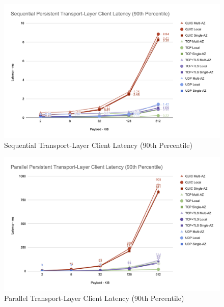 \clearpage

\begin{figure}
    \centering
    \includegraphics[width=\linewidth]{figures/charts/Sequential Persistent Transport-Layer Client Latency (90th Percentile).png}
    \caption{Sequential Transport-Layer Client Latency (90th Percentile)}
    \label{fig:sequential_transport_latency}
\end{figure}
\begin{figure}
    \centering
    \includegraphics[width=\linewidth]{figures/charts/Parallel Persistent Transport-Layer Client Latency (90th Percentile).png}
    \caption{Parallel Transport-Layer Client Latency (90th Percentile)}
    \label{fig:parallel_transport_latency}
\end{figure}

